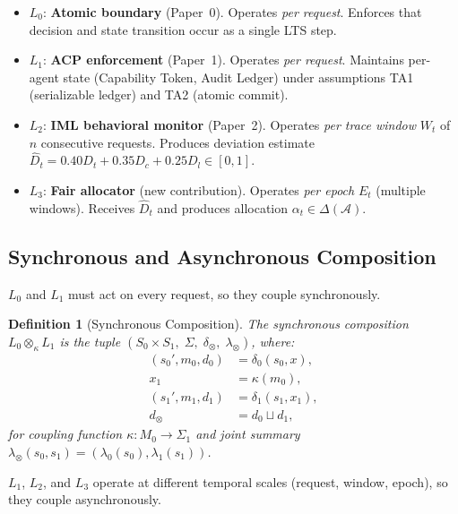 \documentclass[11pt]{article}
\newtheorem{definition}[theorem]{Definition}
\newcommand{\Agents}{\mathcal{A}}
\newcommand{\Dhat}{\widehat{D}}
\newcommand{\State}[1]{S_{#1}}
\newcommand{\Trans}[1]{\delta_{#1}}
\newcommand{\Sum}[1]{\lambda_{#1}}
\newcommand{\Layer}[1]{L_{#1}}
\newcommand{\Comp}{\otimes_\kappa}
\newcommand{\join}{\sqcup}
\begin{document}
\begin{itemize}[noitemsep]
  \item $\Layer{0}$: \textbf{Atomic boundary} (Paper~0). Operates \emph{per request}. Enforces that decision and state transition occur as a single LTS step.
  \item $\Layer{1}$: \textbf{ACP enforcement} (Paper~1). Operates \emph{per request}. Maintains per-agent state (Capability Token, Audit Ledger) under assumptions TA1 (serializable ledger) and TA2 (atomic commit).
  \item $\Layer{2}$: \textbf{IML behavioral monitor} (Paper~2). Operates \emph{per trace window} $W_t$ of $n$ consecutive requests. Produces deviation estimate $\Dhat_t = 0.40 D_t + 0.35 D_c + 0.25 D_l \in [0,1]$.
  \item $\Layer{3}$: \textbf{Fair allocator} (new contribution). Operates \emph{per epoch} $E_t$ (multiple windows). Receives $\Dhat_t$ and produces allocation $\alpha_t \in \Delta(\Agents)$.
\end{itemize}

\subsection{Synchronous and Asynchronous Composition}

$\Layer{0}$ and $\Layer{1}$ must act on every request, so they couple synchronously.

\begin{definition}[Synchronous Composition]
\label{def:sync}
The \emph{synchronous composition} $\Layer{0} \Comp \Layer{1}$ is the tuple $(\State{0} \times \State{1},\; \Sigma,\; \Trans{\otimes},\; \Sum{\otimes})$, where:
\begin{align*}
  (s_0', m_0, d_0) &= \Trans{0}(s_0, x), \\
  x_1 &= \kappa(m_0), \\
  (s_1', m_1, d_1) &= \Trans{1}(s_1, x_1), \\
  d_\otimes &= d_0 \join d_1,
\end{align*}
for coupling function $\kappa: M_0 \to \Sigma_1$ and joint summary $\Sum{\otimes}(s_0, s_1) = (\Sum{0}(s_0), \Sum{1}(s_1))$.
\end{definition}

$\Layer{1}$, $\Layer{2}$, and $\Layer{3}$ operate at different temporal scales (request, window, epoch), so they couple asynchronously.
\end{document}
